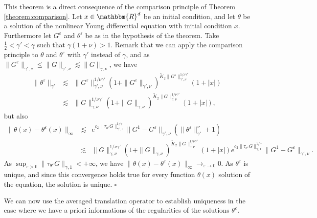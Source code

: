 \documentclass[a4paper,11pt]{article}
\newenvironment{proof}{{\sc Proof.}}{\hfill$\square$}
\begin{document}
\begin{proof}
  This theorem is a direct consequence of the comparison principle of
  Theorem \ref{theorem:comparison}. Let $x \in \mathbbm{R}^{d}$ be an initial
  condition, and let $\theta$ be a solution of the nonlinear Young differential
  equation with initial condition $x$. Furthermore let $G^{\varepsilon}$ and
  $\theta^{\varepsilon}$ be as in the hypothesis of the theorem. Take
  $\frac{1}{2} < \gamma' < \gamma$ such that $\gamma ( 1+ \nu ) >1$. Remark
  that we can apply the comparison principle to $\theta$ and
  $\theta^{\varepsilon}$ with $\gamma'$ instead of $\gamma$, and as $\|
  G^{\varepsilon} \|_{\gamma' , \nu} \leqslant \| G \|_{\gamma' , \nu}
  \lesssim \| G \|_{\gamma , \nu}$, we have
  \begin{eqnarray*}
    \| \theta^{\varepsilon} \|_{\gamma'} & \lesssim & \| G^{\varepsilon}
    \|_{\gamma' , \nu}^{1/ \nu \gamma'} ( 1+ \| G^{\varepsilon} \|_{\gamma' ,
    \nu} )^{\tilde{K}_{2} \| G^{\varepsilon} \|_{\gamma' , \nu}^{1/ \nu
    \gamma'}} ( 1+ | x | ) \\
    & \lesssim & \| G \|_{\gamma , \nu}^{1/ \nu \gamma'} ( 1+ \| G \|_{\gamma
    , \nu} )^{\tilde{K}_{2} \| G \|_{\gamma , \nu}^{1/ \nu \gamma'}} ( 1+ | x
    | ) ,
  \end{eqnarray*}
  but also
  \begin{eqnarray*}
    \| \theta ( x ) - \theta^{\varepsilon} ( x ) \|_{\infty} & \lesssim &
    e^{c_{2} \| \tau_{\theta^{\varepsilon}} G \|_{\gamma' ,1}^{1/ \gamma}} \|
    G^{1} -G^{\varepsilon} \|_{\gamma' , \nu} ( \| \theta^{\varepsilon}
    \|^{\nu}_{\gamma'} +1 )\\
    & \lesssim & \| G \|_{\gamma , \nu}^{1/ \nu \gamma'} ( 1+ \| G \|_{\gamma
    , \nu} )^{\tilde{K}_{2} \| G \|_{\gamma , \nu}^{1/ \nu \gamma'}} ( 1+ | x
    | ) e^{c_{2} \| \tau_{\theta^{\varepsilon}} G \|_{\gamma ,1}^{1/ \gamma}}
    \| G^{1} -G^{\varepsilon} \|_{\gamma' , \nu} .
  \end{eqnarray*}
  As $\sup_{\varepsilon >0} \| \tau_{\theta^{\varepsilon}} G \|_{\gamma ,1} <+
  \infty$, we have $\| \theta ( x ) - \theta^{\varepsilon} ( x ) \|_{\infty}
  \rightarrow_{\varepsilon \rightarrow 0} 0$. As $\theta^{\varepsilon}$ is
  unique, and since this convergence holds true for every function $\theta ( x
  )$ solution of the equation, the solution is unique.
\end{proof}

We can now use the averaged translation operator to establish uniqueness in
the case where we have a priori informations of the regularities of the
solutions $\theta^{\varepsilon}$.
\end{document}
